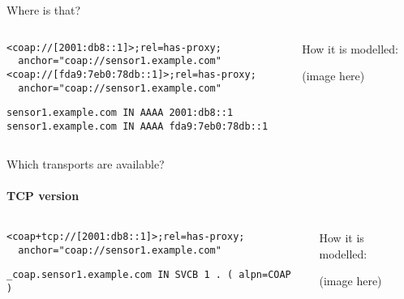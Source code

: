 \begin{frame}[fragile]{Where is that?}
    \begin{columns}
        \begin{column}{0.7\textwidth}
\begin{verbatim}
<coap://[2001:db8::1]>;rel=has-proxy;
  anchor="coap://sensor1.example.com"
<coap://[fda9:7eb0:78db::1]>;rel=has-proxy;
  anchor="coap://sensor1.example.com"
\end{verbatim}
           
            \vspace{1cm}

\begin{verbatim}
sensor1.example.com IN AAAA 2001:db8::1
sensor1.example.com IN AAAA fda9:7eb0:78db::1
\end{verbatim}
        \end{column}
        \begin{column}{0.3\textwidth}
            How it is modelled:
            
            (image here)
        \end{column}
    \end{columns}
\end{frame}

\begin{frame}[fragile]{Which transports are available?}
    \framesubtitle{TCP version}
    \begin{columns}
        \begin{column}{0.7\textwidth}
\begin{verbatim}
<coap+tcp://[2001:db8::1]>;rel=has-proxy;
  anchor="coap://sensor1.example.com"
\end{verbatim}
           
            \vspace{1cm}

\begin{verbatim}
_coap.sensor1.example.com IN SVCB 1 . ( alpn=COAP )
\end{verbatim}
        \end{column}
        \begin{column}{0.3\textwidth}
            How it is modelled:
            
            (image here)
        \end{column}
    \end{columns}
\end{frame}

